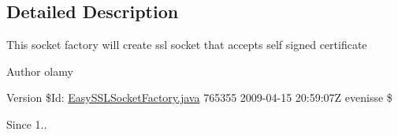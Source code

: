 \subsection{Detailed Description}
This socket factory will create ssl socket that accepts self signed certificate

\begin{DoxyAuthor}{Author}
olamy 
\end{DoxyAuthor}
\begin{DoxyVersion}{Version}
\$\-Id\-: \hyperlink{_easy_s_s_l_socket_factory_8java}{Easy\-S\-S\-L\-Socket\-Factory.\-java} 765355 2009-\/04-\/15 20\-:59\-:07\-Z evenisse \$ 
\end{DoxyVersion}
\begin{DoxySince}{Since}
1.. 
\end{DoxySince}



